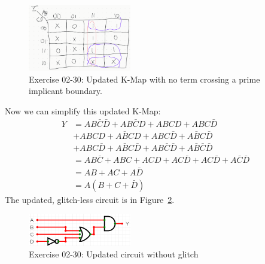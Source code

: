 \documentclass[12pt]{article}
\newenvironment{sol}[1][Solution]{\begin{trivlist}
		\item[\hskip \labelsep {\bfseries #1:}]}{\end{trivlist}}
\begin{document}
\begin{sol}
	\begin{figure}
		\centering
		\includegraphics[width=0.4\textwidth]{02-30-updated-kmap}
		\caption{Exercise 02-30: Updated K-Map with no term crossing
		a prime implicant boundary.}
		\label{02-30-updated-kmap}
	\end{figure}
	Now we can simplify this updated K-Map:
	\begin{align*}
		Y&=AB\bar{C}\bar{D}+AB\bar{C}D+ABCD+ABC\bar{D}\\
		&+ABCD+A\bar{B}CD+ABC\bar{D}+A\bar{B}C\bar{D}\\
		&+ABC\bar{D}+A\bar{B}C\bar{D}+AB\bar{C}\bar{D}+A\bar{B}\bar{C}\bar{D}\\
		&=AB\bar{C}+ABC
		+ACD+AC\bar{D}
		+AC\bar{D}+A\bar{C}\bar{D}\\
		&=AB+AC+A\bar{D}\\
		&=A(B+C+\bar{D})
	\end{align*}
	The updated, glitch-less circuit is in Figure~\ref{02-30-updated-circuit-no-glitch}.
	\begin{figure}
		\centering
		\includegraphics[width=0.4\textwidth]{02-30-updated-circuit-no-glitch}
		\caption{Exercise 02-30: Updated circuit without glitch}
		\label{02-30-updated-circuit-no-glitch}
	\end{figure}
\end{sol}
\end{document}
